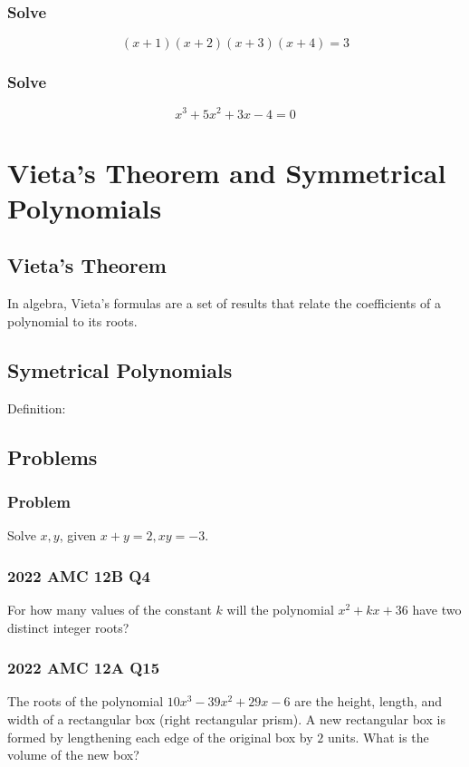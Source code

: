 \documentclass{article}
\begin{document}
\subsubsection{Solve}
$$(x+1)(x+2)(x+3)(x+4)=3$$
\vspace{40px}

\subsubsection{Solve}
$$x^3 + 5 x^2 + 3 x - 4 = 0$$
\vspace{40px}

\section{Vieta's Theorem and Symmetrical Polynomials}
\subsection{Vieta's Theorem}
In algebra, Vieta's formulas are a set of results that relate the coefficients of a polynomial to its roots. 

\pagebreak

\subsection{Symetrical Polynomials}
Definition:
\vspace{30px}
\subsection{Problems}
\subsubsection{Problem}
Solve $x, y$, given $x+y=2, xy=-3$.
\vspace{60px}
\subsubsection{2022 AMC 12B Q4}
For how many values of the constant $k$ will the polynomial $x^{2}+kx+36$ have two distinct integer roots?
\vspace{60px}
\subsubsection{2022 AMC 12A Q15}
The roots of the polynomial $10x^3-39x^2+29x-6$ are the height, length, and width of a rectangular box (right rectangular prism). A new rectangular box is formed by lengthening each edge of the original box by $2$ units. What is the volume of the new box?
\pagebreak
\end{document}
